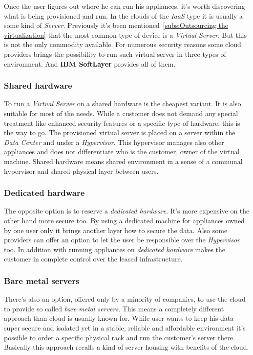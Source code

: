 Once the user figures out where he can run his appliances, it's worth discovering what is being provisioned and run. In the clouds of the \emph{IaaS} type it is usually a some kind of \emph{Server}. Previously it's been mentioned~\ref{subs:Outsourcing the virtualization} that the most common type of device is a \emph{Virtual Server}. But this is not the only commodity available. For numerous security reasons some cloud providers brings the possibility to run such virtual server in three types of environment. And \textbf{IBM SoftLayer} provides all of them.

\subsubsection{Shared hardware}
\label{subs:Shared hardware}

To run a \emph{Virtual Server} on a shared hardware is the cheapest variant. It is also suitable for most of the needs. While a customer does not demand any special treatment like enhanced security features or a specific type of hardware, this is the way to go. The provisioned virtual server is placed on a server within the \emph{Data Center} and under a \emph{Hypervisor}. This hypervisor manages also other appliances and does not differentiate who is the customer, owner of the virtual machine. Shared hardware means shared environment in a sense of a communal hypervisor and shared physical layer between users.

\subsubsection{Dedicated hardware}
\label{subs:Dedicated hardware}

The opposite option is to reserve a \emph{dedicated hardware}. It's more expensive on the other hand more secure too. By using a dedicated machine for appliances owned by one user only it brings another layer how to secure the data. Also some providers can offer an option to let the user be responsible over the \emph{Hypervisor} too. In addition with running appliances on \emph{dedicated hardware} makes the customer in complete control over the leased infrastructure.

\subsubsection{Bare metal servers}
\label{subs:Bare metal servers}

There's also an option, offered only by a minority of companies, to use the cloud to provide so called \emph{bare metal servers}. This means a completely different approach than cloud is usually known for. While user wants to keep his data super secure and isolated yet in a stable, reliable and affordable environment it's possible to order a specific physical rack and run the customer's server there. Basically this approach recalls a kind of server housing with benefits of the cloud.


